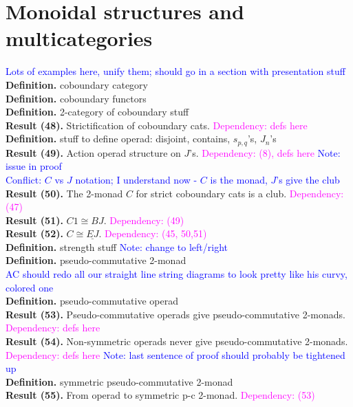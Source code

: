 \documentclass{amsart}
\newcommand{\ul}{\underline}
\begin{document}
\section{Monoidal structures and multicategories}
\textcolor{blue}{Lots of examples here, unify them; should go in a section with presentation stuff}
\\ \textbf{Definition.} coboundary category
\\ \textbf{Definition.} coboundary functors
\\ \textbf{Definition.} 2-category of coboundary stuff
\\ \textbf{Result (48).} Strictification of coboundary cats. \textcolor{magenta}{Dependency: defs here}
\\ \textbf{Definition.} stuff to define operad: disjoint, contains, $s_{p,q}$'s, $J_n$'s
\\ \textbf{Result (49).} Action operad structure on $J$'s. \textcolor{magenta}{Dependency: (8), defs here} \textcolor{blue}{Note: issue in proof}
\\ \textcolor{blue}{Conflict: $C$ vs $J$ notation; I understand now - $C$ is the monad, $J$'s give the club}
\\ \textbf{Result (50).} The 2-monad $C$ for strict coboundary cats is a club. \textcolor{magenta}{Dependency: (47)}
\\ \textbf{Result (51).} $C1 \cong BJ$. \textcolor{magenta}{Dependency: (49)}
\\ \textbf{Result (52).} $C \cong \ul{EJ}$. \textcolor{magenta}{Dependency: (45, 50,51)}
\\ \textbf{Definition.} strength stuff \textcolor{blue}{Note: change to left/right}
\\ \textbf{Definition.} pseudo-commutative 2-monad
\\ \textcolor{blue}{AC should redo all our straight line string diagrams to look pretty like his curvy, colored one}
\\ \textbf{Definition.} pseudo-commutative operad
\\ \textbf{Result (53).} Pseudo-commutative operads give pseudo-commutative 2-monads. \textcolor{magenta}{Dependency: defs here}
\\ \textbf{Result (54).} Non-symmetric operads never give pseudo-commutative 2-monads. \textcolor{magenta}{Dependency: defs here} \textcolor{blue}{Note: last sentence of proof should probably be tightened up}
\\ \textbf{Definition.} symmetric pseudo-commutative 2-monad
\\ \textbf{Result (55).} From operad to symmetric p-c 2-monad. \textcolor{magenta}{Dependency: (53)} 
\end{document}
